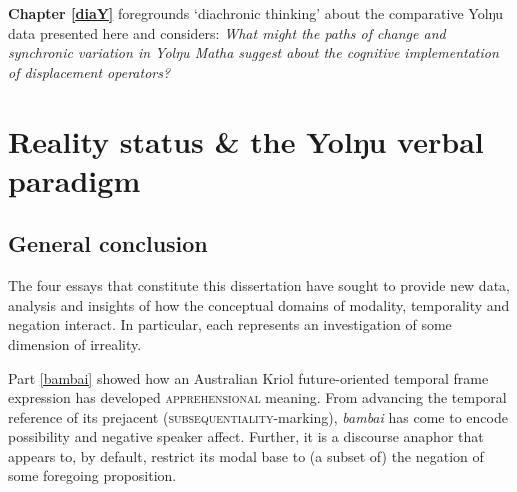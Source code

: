 \documentclass[12pt,dvipsnames]{report}
\newcommand{\mcom}[1]
{\marginpar{\color{black}\raggedleft\raggedright\hspace{0pt}\linespread{0.9}\footnotesize{#1}}}
\begin{document}
		\textbf{Chapter \ref{diaY} }foregrounds `diachronic thinking' about the comparative Yolŋu data presented here and considers: {\em What might the paths of change and synchronic variation in Yolŋu Matha suggest about the cognitive implementation of displacement operators?}
		\vfill
		
		\upshape 
\fi


\part{Reality status \& the Yolŋu verbal paradigm}\label{yolŋu}
%


%

\chapter*{General conclusion}



The four essays that constitute this dissertation have sought to provide new data, analysis and insights of how the conceptual domains of modality, temporality and negation interact. In particular, each represents an investigation of some dimension of irreality.

Part \ref{bambai} showed how an Australian Kriol future-oriented temporal frame expression has developed \textsc{apprehensional} meaning. From advancing the temporal reference of its prejacent (\textsc{subsequentiality}-marking), \textit{bambai} has come to encode possibility and negative speaker affect. Further, it is a discourse anaphor that appears to, by default, restrict its modal base to (a subset of) the negation of some foregoing proposition.
\end{document}
